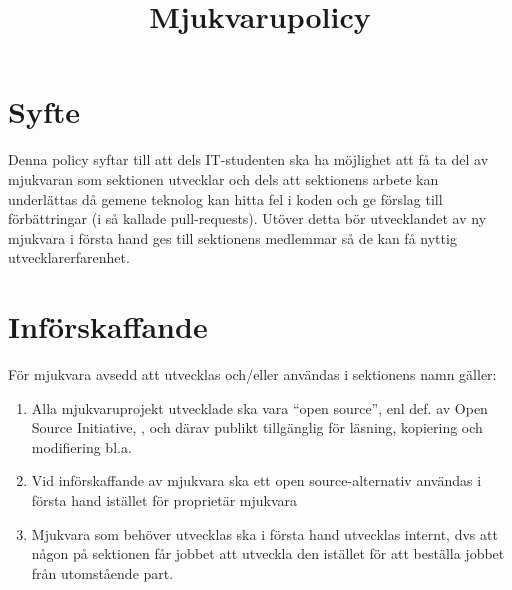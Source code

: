 \documentclass[11pt, includeaddress]{classes/cthit}
\begin{document}
\title{Mjukvarupolicy}
\maketitle

\thispagestyle{empty}

\newpage

\makeheadfoot%

\setcounter{tocdepth}{2}
\setcounter{page}{1}
\tableofcontents

\newpage

\section{Syfte}
Denna policy syftar till att dels IT-studenten ska ha möjlighet att få ta del av mjukvaran som sektionen utvecklar och dels att sektionens arbete kan underlättas då gemene teknolog kan hitta fel i koden och ge förslag till förbättringar (i så kallade pull-requests). Utöver detta bör utvecklandet av ny mjukvara i första hand ges till sektionens medlemmar så de kan få nyttig utvecklarerfarenhet.

\section{Införskaffande}
För mjukvara avsedd att utvecklas och/eller användas i sektionens namn gäller:
\begin{enumerate}
	\item Alla mjukvaruprojekt utvecklade ska vara  ``open source'', enl def. av Open Source Initiative, , och därav publikt tillgänglig för läsning, kopiering och modifiering bl.a. 
	\item Vid införskaffande av mjukvara ska ett open source-alternativ användas i första hand istället för proprietär mjukvara
 	\item Mjukvara som behöver utvecklas ska i första hand utvecklas internt, dvs att någon på sektionen får jobbet att utveckla den istället för att beställa jobbet från utomstående part.
\end{enumerate}
\end{document}
